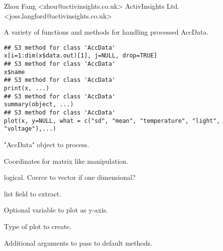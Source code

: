\documentclass[a4paper]{book}
\begin{document}
%
\begin{Author}\relax
Zhou Fang <zhou@activinsights.co.uk>
ActivInsights Ltd. <joss.langford@activinsights.co.uk>
\end{Author}
\aliasA{[.AccData}{AccData}{[.AccData}
%
\begin{Description}\relax
A variety of functions and methods for handling processed AccData.
\end{Description}
%
\begin{Usage}
\begin{verbatim}
## S3 method for class 'AccData'
x[i=1:dim(x$data.out)[1], j=NULL, drop=TRUE]
## S3 method for class 'AccData'
x$name
## S3 method for class 'AccData'
print(x, ...)
## S3 method for class 'AccData'
summary(object, ...)
## S3 method for class 'AccData'
plot(x, y=NULL, what = c("sd", "mean", "temperature", "light", "voltage"),...)
\end{verbatim}
\end{Usage}
%
\begin{Arguments}
\begin{ldescription}
\item[\code{x, object}] "AccData" object to process.
\item[\code{i,j}] Coordinates for matrix like manipulation.
\item[\code{drop}] logical. Coerce to vector if one dimensional?
\item[\code{name}] list field to extract.
\item[\code{y}] Optional variable to plot as y-axis.
\item[\code{what}] Type of plot to create.
\item[\code{...}] Additional arguments to pass to default methods.
\end{ldescription}
\end{Arguments}
%
\end{document}
